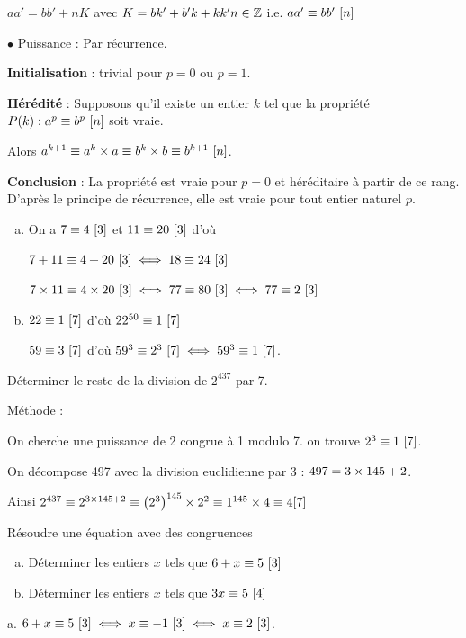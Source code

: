 \documentclass[10pt,a4paper]{article}
\begin{document}
$aa'=bb'+nK$ avec $K=bk'+b'k +kk'n \in \mathbb{Z}$ i.e. ${aa'} \equiv {bb'} ~ [{n}]$

$\bullet$ Puissance : Par récurrence.

\textbf{Initialisation} : trivial pour $p=0$ ou $p=1$.

\textbf{Hérédité }: Supposons qu'il existe un entier $k$ tel que la propriété $P(k) : {a^p} \equiv {b^p} ~ [{n}]$  soit vraie.

Alors $a^{k+1} \equiv a^k \times a \equiv b^k \times b \equiv b^{k+1} ~[n]$.

\textbf{Conclusion} : La propriété est vraie pour $p=0$ et héréditaire à partir de ce rang. D'après le principe de récurrence, elle est vraie pour tout entier naturel $p$.



\exes
\begin{enumerate}[a.]
\item On a ${7} \equiv {4} ~ [{3}]$ et ${11} \equiv {20} ~ [{3}]$ d'où 

${7+11} \equiv {4+20} ~ [{3}] \iff {18} \equiv {24} ~ [{3}]$

${7 \times 11} \equiv {4 \times20} ~ [{3}] \iff {77} \equiv {80} ~ [{3}] \iff {77} \equiv {2} ~ [{3}]$

\item ${22} \equiv {1} ~ [{7}]$ d'où ${22^{50}} \equiv {1} ~ [{7}]$

${59} \equiv {3} ~ [{7}]$ d'où ${59^3} \equiv {2^3} ~ [{7}] \iff {59^3} \equiv {1} ~ [{7}]$.

\end{enumerate}


\exe Déterminer le reste de la division de $2^{437}$ par 7.

Méthode :

On cherche une puissance de 2 congrue à 1 modulo 7. on trouve ${2^3} \equiv {1} ~ [{7}]$.

On décompose 497 avec la division euclidienne par 3 : $497=3 \times 145 + 2$.

Ainsi $2^{437} \equiv 2^{3 \times 145 +2} \equiv \left(2^3 \right)^{145} \times 2^2 \equiv 1^{145} \times 4 \equiv 4 [7]$

\medskip

\exe Résoudre une équation avec des congruences
\begin{enumerate}[a.]
\item Déterminer les entiers $x$ tels que ${6+x} \equiv {5} ~ [{3}]$
\item Déterminer les entiers $x$ tels que ${3x} \equiv {5} ~ [{4}]$

\end{enumerate}


a. ${6+x} \equiv {5} ~ [{3}] \iff {x} \equiv {-1} ~ [{3}] \iff {x} \equiv {2} ~ [{3}]$.
\end{document}

